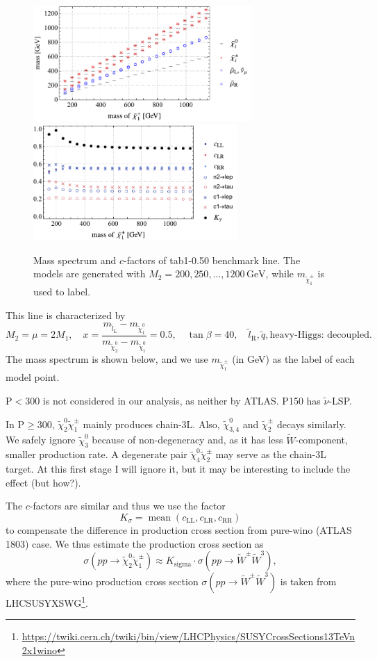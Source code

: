 \documentclass[a4paper,10pt,captions=tableheading,DIV=14]{scrartcl}
\numberwithin{equation}{section}
\newcommand\w[1]{_{\mathrm{#1}}}
\newcommand\unit[1]{\,\mathrm{#1}\xspace}
\newcommand\GeV{\unit{GeV}}
\newcommand\neut  [1][\relax]{{\tilde\chi^0_{#1}}}
\newcommand\charPM[1][\relax]{{\tilde\chi^\pm_{#1}}}
\begin{document}
\begin{figure}[h]
  \centering
  \includegraphics[height=125pt]{../plots/plot_data_tab1_x050.pdf}
  \includegraphics[height=125pt]{../plots/plot_data_tab1_x050_cfactors.pdf}
  \caption{Mass spectrum and $c$-factors of tab1-0.50 benchmark line. The models are generated with $M_2=200,250,\dots,1200\GeV$, while $m_{\charPM[1]}$ is used to label.}
\end{figure}

This line is characterized by
\begin{equation}
 M_2=\mu=2M_1,
\quad
 x = \frac{m_{\tilde l\w L}-m_{\neut[1]}}{m_{\neut[2]}-m_{\neut[1]}}=0.5,
\quad
 \tan\beta=40,
\quad
 \tilde l\w R, \tilde q, \text{heavy-Higgs: decoupled}.
\end{equation}
The mass spectrum is shown below, and we use $m_{\charPM[1]}$ (in GeV) as the label of each model point.

P$<$300 is not considered in our analysis, as neither by ATLAS. P150 has $\tilde\nu$-LSP.

In P$\ge$300, $\neut[2]\charPM[1]$ mainly produces chain-3L.
Also, $\neut[3,4]$ and $\charPM[2]$ decays similarly.
We safely ignore $\neut[3]$ because of non-degeneracy and, as it has less $\tilde W$-component, smaller production rate.
A degenerate pair $\neut[4]\charPM[2]$ may serve as the chain-3L target.
At this first stage I will ignore it, but it may be interesting to include the effect (but how?).

The $c$-factors are similar and thus we use the factor
\begin{equation}
 K_\sigma = \mathop{\mathrm{mean}}(c\w{LL},c\w{LR},c\w{RR})
\end{equation}
to compensate the difference in production cross section from pure-wino (ATLAS 1803) case.
We thus estimate the production cross section as
\begin{equation}
 \sigma(pp\to\neut[2]\charPM[1])\approx K\w{sigma}\cdot \sigma(pp\to\tilde W^\pm\tilde W^3),
\end{equation}
where the pure-wino production cross section $\sigma(pp\to\tilde W^\pm\tilde W^3)$ is taken from LHCSUSYXSWG\footnote{\url{https://twiki.cern.ch/twiki/bin/view/LHCPhysics/SUSYCrossSections13TeVn2x1wino}}.
\end{document}
